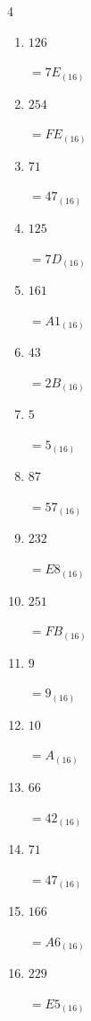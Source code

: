 \begin{multicols}{4}
\begin{enumerate}
        $=DA_{(16)}$

  \item $126$

        $=7E_{(16)}$

  \item $254$

        $=FE_{(16)}$

  \item $71$

        $=47_{(16)}$

  \item $125$

        $=7D_{(16)}$

\columnbreak %

  \item $161$

        $=A1_{(16)}$

  \item $43$

        $=2B_{(16)}$

  \item $5$

        $=5_{(16)}$

  \item $87$

        $=57_{(16)}$

  \item $232$

        $=E8_{(16)}$

  \item $251$

        $=FB_{(16)}$

  \item $9$

        $=9_{(16)}$

  \item $10$

        $=A_{(16)}$

  \item $66$

        $=42_{(16)}$

  \item $71$

        $=47_{(16)}$

  \item $166$

        $=A6_{(16)}$

  \item $229$

        $=E5_{(16)}$


\end{enumerate}
\end{multicols}
